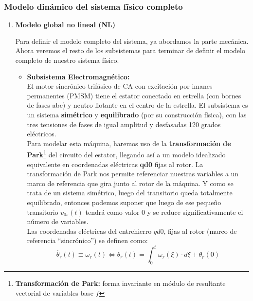 \documentclass[10pt]{article}
\begin{document}
\subsubsection{Modelo dinámico del sistema físico completo}

\begin{enumerate}
    \renewcommand{\theenumi}{\alph{enumi}} %
    \item \textbf{Modelo global no lineal (NL)}
    
    Para definir el modelo completo del sistema, ya abordamos la parte mecánica. Ahora veremos el resto de los subsistemas para terminar de definir el modelo completo de nuestro sistema físico.
	\begin{itemize}
		\item \textbf{Subsistema Electromagnético:}\vspace{0.3cm}\\
		El motor sincrónico trifásico de CA con excitación por imanes permanentes (PMSM) tiene el estator conectado en estrella (con bornes de fases abc) y neutro flotante en el centro de la estrella.
		El subsistema es un sistema \textbf{simétrico} y \textbf{equilibrado} (por su construcción física), con las tres tensiones de fases de igual amplitud y desfasadas 120 grados eléctricos.
		\vspace{0.3cm}\\
		Para modelar esta máquina, haremos uso de la \textbf{transformación de Park}\footnote[1]{\textbf{Transformación de Park:} forma invariante en módulo de resultante vectorial de variables base $f$} del circuito del estator, llegando así a un modelo idealizado equivalente en coordenadas eléctricas \textbf{qd0} fijas al rotor.
		La transformación de Park nos permite referenciar nuestras variables a un marco de referencia que gira junto al rotor de la máquina.
		Y como se trata de un sistema simétrico, luego del transitorio queda totalmente equilibrado, entonces podemos suponer que luego de ese pequeño transitorio $v_{0s}(t)$ tendrá como valor $0$ y se reduce significativamente el número de variables.
		\vspace{0.3cm}\\
		Las coordenadas eléctricas del entrehierro $qd0$, fijas al rotor (marco de referencia “sincrónico”) se definen como:
		\begin{equation}
			\dot{\theta_{r}}\left ( t \right )\equiv \omega_{r}\left ( t \right )\Leftrightarrow \theta_{r}\left ( t \right )=\int_{0}^{t}\omega_{r}\left ( \xi \right )\cdot d\xi + \theta_{r}\left ( 0 \right )

\end{equation}
\end{itemize}
\end{enumerate}
\end{document}
